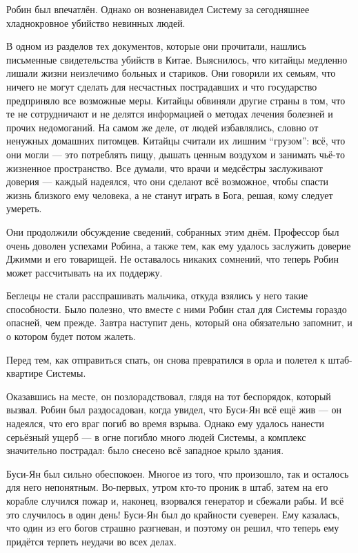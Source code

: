 \documentclass[a5paper, 9pt,
final, openany, twoside=true]{memoir}
\begin{document}
Робин был впечатлён. Однако он возненавидел Систему за сегодняшнее хладнокровное убийство невинных людей.\bigskip

В одном из разделов тех документов, которые они прочитали, нашлись письменные свидетельства убийств в Китае. Выяснилось, что китайцы медленно лишали жизни неизлечимо больных и стариков. Они говорили их семьям, что ничего не могут сделать для несчастных пострадавших и что государство предприняло все возможные меры. Китайцы обвиняли другие страны в том, что те не сотрудничают и не делятся информацией о методах лечения болезней и прочих недомоганий. На самом же деле, от людей избавлялись, словно от ненужных домашних питомцев. Китайцы считали их лишним ``грузом'': всё, что они могли — это потреблять пищу, дышать ценным воздухом и занимать чьё-то жизненное пространство. Все думали, что врачи и медсёстры заслуживают доверия — каждый надеялся, что они сделают всё возможное, чтобы спасти жизнь близкого ему человека, а не станут играть в Бога, решая, кому следует умереть.\bigskip

Они продолжили обсуждение сведений, собранных этим днём. Профессор был очень доволен успехами Робина, а также тем, как ему удалось заслужить доверие Джимми и его товарищей. Не оставалось никаких сомнений, что теперь Робин может рассчитывать на их поддержу.

Беглецы не стали расспрашивать мальчика, откуда взялись у него такие способности. Было полезно, что вместе с ними Робин стал для Системы гораздо опасней, чем прежде. Завтра наступит день, который она обязательно запомнит, и о котором будет потом жалеть.

Перед тем, как отправиться спать, он снова превратился в орла и полетел к штаб-квартире Системы.

Оказавшись на месте, он позлорадствовал, глядя на тот беспорядок, который вызвал. Робин был раздосадован, когда увидел, что Буси-Ян всё ещё жив — он надеялся, что его враг погиб во время взрыва. Однако ему удалось нанести серьёзный ущерб — в огне погибло много людей Системы, а комплекс значительно пострадал: было снесено всё западное крыло здания.

Буси-Ян был сильно обеспокоен. Многое из того, что произошло, так и осталось для него непонятным. Во-первых, утром кто-то проник в штаб, затем на его корабле случился пожар и, наконец, взорвался генератор и сбежали рабы. И всё это случилось в один день! Буси-Ян был до крайности суеверен. Ему казалась, что один из его богов страшно разгневан, и поэтому он решил, что теперь ему придётся терпеть неудачи во всех делах.
\end{document}
